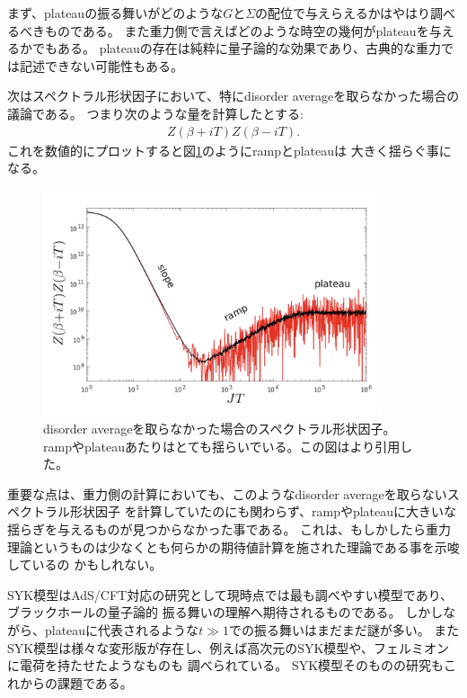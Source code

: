 まず、plateauの振る舞いがどのような$G$と$\Sigma$の配位で与えらえるかはやはり調べるべきものである。
また重力側で言えばどのような時空の幾何がplateauを与えるかでもある。
plateauの存在は純粋に量子論的な効果であり、古典的な重力では記述できない可能性もある。

次はスペクトラル形状因子において、特にdisorder averageを取らなかった場合の議論である。
つまり次のような量を計算したとする:
\begin{align}
	Z(\beta + iT)Z(\beta - iT).
\end{align}
これを数値的にプロットすると図\ref{fig:non_disorder_averaged_g}のようにrampとplateauは
大きく揺らぐ事になる。
\begin{figure}[ht]
	\centering
	\includegraphics[width=10cm]{figures/non_disorder_averaged_g}
	\caption{disorder averageを取らなかった場合のスペクトラル形状因子。
	rampやplateauあたりはとても揺らいでいる。この図は\cite{stanford_chaos}より引用した。}
	\label{fig:non_disorder_averaged_g}
\end{figure}

重要な点は、重力側の計算においても、このようなdisorder averageを取らないスペクトラル形状因子
を計算していたのにも関わらず、rampやplateauに大きいな揺らぎを与えるものが見つからなかった事である。
これは、もしかしたら重力理論というものは少なくとも何らかの期待値計算を施された理論である事を示唆しているの
かもしれない\cite{stanford_chaos}。

SYK模型はAdS/CFT対応の研究として現時点では最も調べやすい模型であり、ブラックホールの量子論的
振る舞いの理解へ期待されるものである。
しかしながら、plateauに代表されるような$t \gg 1$での振る舞いはまだまだ謎が多い。
またSYK模型は様々な変形版が存在し、例えば高次元のSYK模型や、フェルミオンに電荷を持たせたようなものも
調べられている\cite{gaikwad}\cite{berkooz}。
SYK模型そのものの研究もこれからの課題である。

\pagebreak

